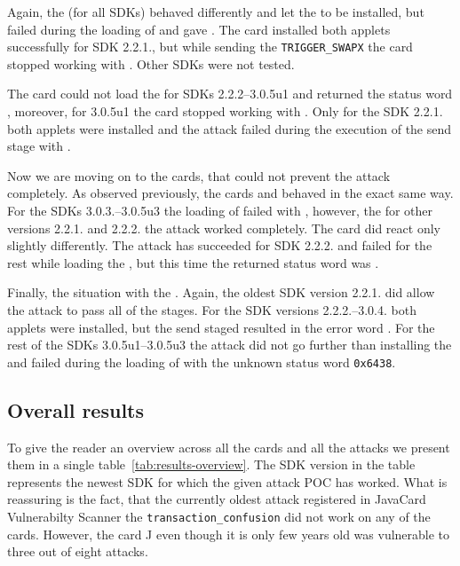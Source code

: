 \documentclass{../llncs/llncs}
\begin{document}
            Again, the \Cnewcard (for all SDKs) behaved differently and let the \vulnscap to be installed, but failed during the loading of \appletscap and gave \shortswconditionsnotsatisfied. The card \Acard installed both applets successfully for SDK 2.2.1., but while sending the \texttt{TRIGGER_SWAPX} the card stopped working with \scardwunpoweredcard. Other SDKs were not tested.

        The card \Dcard could not load the \appletscap for SDKs 2.2.2--3.0.5u1 and returned the status word \shortswwrongdata, moreover, for 3.0.5u1 the card stopped working with \scardenottransacted. Only for the SDK 2.2.1. both applets were installed and the attack failed during the execution of the send stage with \shortswclanotsupported.


    Now we are moving on to the cards, that could not prevent the attack completely. As observed previously, the cards \Fcard and \Hcard behaved in the exact same way. For the SDKs 3.0.3.--3.0.5u3 the loading of \appletscap failed with \shortswwrongdata, however, the for other versions 2.2.1. and 2.2.2. the attack worked completely. The card \Inewcard did react only slightly differently. The attack has succeeded for SDK 2.2.2. and failed for the rest while loading the \appletscap, but this time the returned status word was \shortswconditionsnotsatisfied.

    Finally, the situation with the \Jcard. Again, the oldest SDK version 2.2.1. did allow the attack to pass all of the stages. For the SDK versions 2.2.2.--3.0.4. both applets were installed, but the send staged resulted in the error word \shortswinsnotsupported. For the rest of the SDKs 3.0.5u1--3.0.5u3 the attack did not go further than installing the \vulnscap and failed during the loading of \appletscap with the unknown status word \texttt{0x6438}.


            \subsection{Overall results}

        To give the reader an overview across all the cards and all the attacks we present them in a single table~\ref{tab:results-overview}. The SDK version in the table represents the newest SDK for which the given attack POC has worked. What is reassuring is the fact, that the currently oldest attack registered in JavaCard Vulnerabilty Scanner the \texttt{transaction_confusion} did not work on any of the cards. However, the card J even though it is only few years old was vulnerable to three out of eight attacks.
    
\end{document}
